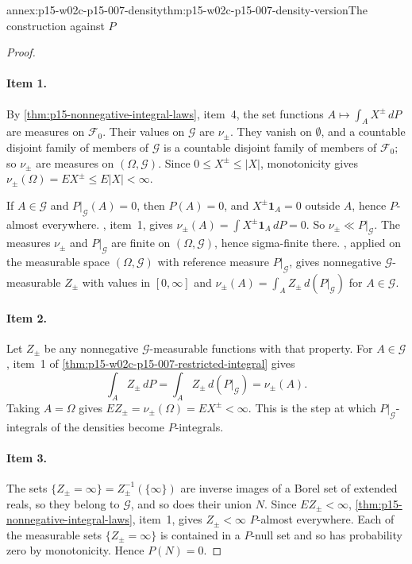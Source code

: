 \begin{annexitem}{annex:p15-w02c-p15-007-density}{thm:p15-w02c-p15-007-density-version}{The construction against \(P\)}
\begin{proof}
\paragraph{Item 1.}
By \cref{thm:p15-nonnegative-integral-laws}, item~4, the set functions
\(A\mapsto\int_AX^\pm\,dP\) are measures on \(\mathcal F_0\). Their values
on \(\mathcal G\) are \(\nu_\pm\). They vanish on \(\emptyset\), and a
countable disjoint family of members of \(\mathcal G\) is a countable
disjoint family of members of \(\mathcal F_0\); so \(\nu_\pm\) are
measures on \((\Omega,\mathcal G)\). Since \(0\leq X^\pm\leq|X|\),
monotonicity gives \(\nu_\pm(\Omega)=EX^\pm\leq E|X|<\infty\).

If \(A\in\mathcal G\) and \(P|_{\mathcal G}(A)=0\), then \(P(A)=0\), and
\(X^\pm\mathbf1_A=0\) outside \(A\), hence \(P\)-almost everywhere.
, item~1, gives
\(\nu_\pm(A)=\int X^\pm\mathbf1_A\,dP=0\). So
\(\nu_\pm\ll P|_{\mathcal G}\). The measures \(\nu_\pm\) and
\(P|_{\mathcal G}\) are finite on \((\Omega,\mathcal G)\), hence
sigma-finite there. , applied on the
measurable space \((\Omega,\mathcal G)\) with reference measure
\(P|_{\mathcal G}\), gives nonnegative \(\mathcal G\)-measurable
\(Z_\pm\) with values in \([0,\infty]\) and
\(\nu_\pm(A)=\int_AZ_\pm\,d(P|_{\mathcal G})\) for \(A\in\mathcal G\).

\paragraph{Item 2.}
Let \(Z_\pm\) be any nonnegative \(\mathcal G\)-measurable functions with
that property. For \(A\in\mathcal G\), item~1 of
\cref{thm:p15-w02c-p15-007-restricted-integral} gives
\[
 \int_AZ_\pm\,dP=\int_AZ_\pm\,d(P|_{\mathcal G})=\nu_\pm(A).
\]
Taking \(A=\Omega\) gives \(EZ_\pm=\nu_\pm(\Omega)=EX^\pm<\infty\).
This is the step at which \(P|_{\mathcal G}\)-integrals of the densities
become \(P\)-integrals.

\paragraph{Item 3.}
The sets \(\{Z_\pm=\infty\}=Z_\pm^{-1}(\{\infty\})\) are inverse images of
a Borel set of extended reals, so they belong to \(\mathcal G\), and so
does their union \(N\). Since \(EZ_\pm<\infty\),
\cref{thm:p15-nonnegative-integral-laws}, item~1, gives \(Z_\pm<\infty\)
\(P\)-almost everywhere. Each of the measurable sets
\(\{Z_\pm=\infty\}\) is contained in a \(P\)-null set and so has
probability zero by monotonicity. Hence \(P(N)=0\).


\end{proof}
\end{annexitem}
